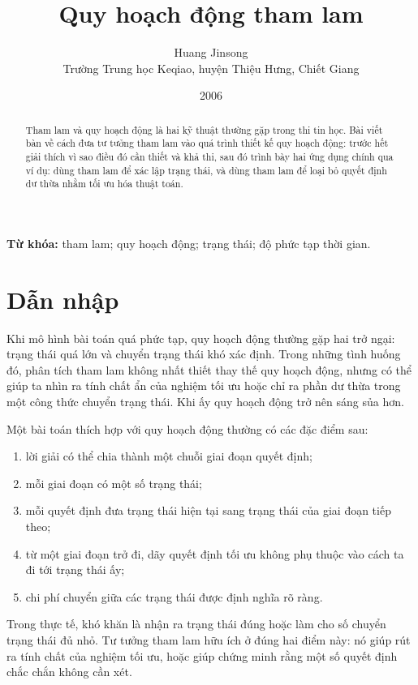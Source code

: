 \documentclass[11pt]{article}
\title{Quy hoạch động tham lam}
\author{Huang Jinsong\\Trường Trung học Keqiao, huyện Thiệu Hưng, Chiết Giang}
\date{2006}
\begin{document}
\maketitle


\renewcommand{\abstractname}{Tóm tắt}
\begin{abstract}
Tham lam và quy hoạch động là hai kỹ thuật thường gặp trong thi tin học. Bài
viết bàn về cách đưa tư tưởng tham lam vào quá trình thiết kế quy hoạch động:
trước hết giải thích vì sao điều đó cần thiết và khả thi, sau đó trình bày hai
ứng dụng chính qua ví dụ: dùng tham lam để xác lập trạng thái, và dùng tham
lam để loại bỏ quyết định dư thừa nhằm tối ưu hóa thuật toán.
\end{abstract}

\noindent\textbf{Từ khóa:} tham lam; quy hoạch động; trạng thái; độ phức tạp
thời gian.

\section{Dẫn nhập}

Khi mô hình bài toán quá phức tạp, quy hoạch động thường gặp hai trở ngại:
trạng thái quá lớn và chuyển trạng thái khó xác định. Trong những tình huống
đó, phân tích tham lam không nhất thiết thay thế quy hoạch động, nhưng có thể
giúp ta nhìn ra tính chất ẩn của nghiệm tối ưu hoặc chỉ ra phần dư thừa trong
một công thức chuyển trạng thái. Khi ấy quy hoạch động trở nên sáng sủa hơn.

Một bài toán thích hợp với quy hoạch động thường có các đặc điểm sau:
\begin{enumerate}
  \item lời giải có thể chia thành một chuỗi giai đoạn quyết định;
  \item mỗi giai đoạn có một số trạng thái;
  \item mỗi quyết định đưa trạng thái hiện tại sang trạng thái của giai đoạn
  tiếp theo;
  \item từ một giai đoạn trở đi, dãy quyết định tối ưu không phụ thuộc vào cách
  ta đi tới trạng thái ấy;
  \item chi phí chuyển giữa các trạng thái được định nghĩa rõ ràng.
\end{enumerate}

Trong thực tế, khó khăn là nhận ra trạng thái đúng hoặc làm cho số chuyển trạng
thái đủ nhỏ. Tư tưởng tham lam hữu ích ở đúng hai điểm này: nó giúp rút ra
tính chất của nghiệm tối ưu, hoặc giúp chứng minh rằng một số quyết định chắc
chắn không cần xét.
\end{document}
